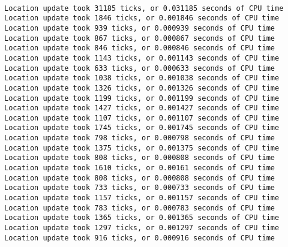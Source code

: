 \documentclass[12pt,a4paper]{article}
\begin{document}
	\texttt{\\
    Location update took 31185 ticks, or 0.031185 seconds of CPU time\\
    Location update took 1846 ticks, or 0.001846 seconds of CPU time\\
    Location update took 939 ticks, or 0.000939 seconds of CPU time\\
    Location update took 867 ticks, or 0.000867 seconds of CPU time\\
    Location update took 846 ticks, or 0.000846 seconds of CPU time\\
    Location update took 1143 ticks, or 0.001143 seconds of CPU time\\
    Location update took 633 ticks, or 0.000633 seconds of CPU time\\
    Location update took 1038 ticks, or 0.001038 seconds of CPU time\\
    Location update took 1326 ticks, or 0.001326 seconds of CPU time\\
    Location update took 1199 ticks, or 0.001199 seconds of CPU time\\
    Location update took 1427 ticks, or 0.001427 seconds of CPU time\\
    Location update took 1107 ticks, or 0.001107 seconds of CPU time\\
    Location update took 1745 ticks, or 0.001745 seconds of CPU time\\
    Location update took 798 ticks, or 0.000798 seconds of CPU time\\
    Location update took 1375 ticks, or 0.001375 seconds of CPU time\\
    Location update took 808 ticks, or 0.000808 seconds of CPU time\\
    Location update took 1610 ticks, or 0.00161 seconds of CPU time\\
    Location update took 808 ticks, or 0.000808 seconds of CPU time\\
    Location update took 733 ticks, or 0.000733 seconds of CPU time\\
    Location update took 1157 ticks, or 0.001157 seconds of CPU time\\
    Location update took 783 ticks, or 0.000783 seconds of CPU time\\
    Location update took 1365 ticks, or 0.001365 seconds of CPU time\\
    Location update took 1297 ticks, or 0.001297 seconds of CPU time\\
    Location update took 916 ticks, or 0.000916 seconds of CPU time\\
}
\end{document}
